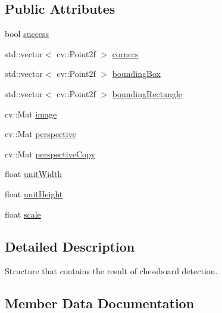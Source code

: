 \subsection*{Public Attributes}
\begin{DoxyCompactItemize}
\item 
bool \hyperlink{struct_chessboard_detector_result_a7f5e6c90f4d7b3c948d1e1ddab933df9}{success}
\item 
std\+::vector$<$ cv\+::\+Point2f $>$ \hyperlink{struct_chessboard_detector_result_a69a0fd183e694c1fb80bbad1ed2d6833}{corners}
\item 
std\+::vector$<$ cv\+::\+Point2f $>$ \hyperlink{struct_chessboard_detector_result_a6887aab98e7283ccfa4a51f8714d5260}{bounding\+Box}
\item 
std\+::vector$<$ cv\+::\+Point2f $>$ \hyperlink{struct_chessboard_detector_result_a1c1c71bb678c2eb872d9f8c4ae0a9871}{bounding\+Rectangle}
\item 
cv\+::\+Mat \hyperlink{struct_chessboard_detector_result_a9cb87f19e643fa012305b5575720332a}{image}
\item 
cv\+::\+Mat \hyperlink{struct_chessboard_detector_result_ae36efe72eb31949739d7ce8905ed2f41}{perspective}
\item 
cv\+::\+Mat \hyperlink{struct_chessboard_detector_result_a984f12b2b22c6a34a8147aa7d3d3eff0}{perspective\+Copy}
\item 
float \hyperlink{struct_chessboard_detector_result_a967889233f9ea3e34e7b215041105801}{unit\+Width}
\item 
float \hyperlink{struct_chessboard_detector_result_a95e32f26ef920afcc1e64af548120285}{unit\+Height}
\item 
float \hyperlink{struct_chessboard_detector_result_abf6c377b55ae8db5b653cb581b0baf30}{scale}
\end{DoxyCompactItemize}


\subsection{Detailed Description}
Structure that contains the result of chessboard detection. 

\subsection{Member Data Documentation}
